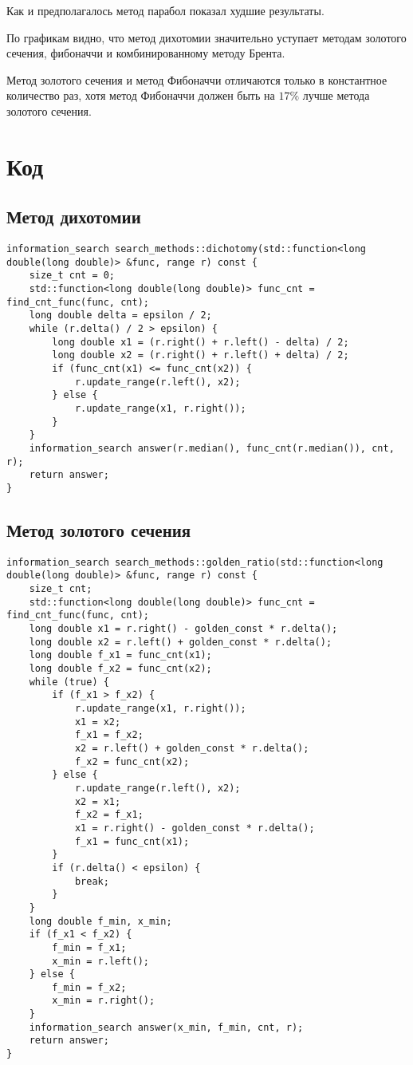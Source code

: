 Как и предполагалось метод парабол показал худшие результаты.

По графикам видно, что метод дихотомии значительно уступает
методам золотого сечения, фибоначчи и комбинированному методу Брента.

Метод золотого сечения и метод Фибоначчи отличаются только в константное количество раз, хотя 
метод Фибоначчи должен быть на $17\%$ лучше метода золотого сечения.

\newpage
\section {Код}
\subsection {Метод дихотомии}

\begin{lstlisting}
information_search search_methods::dichotomy(std::function<long double(long double)> &func, range r) const {
	size_t cnt = 0;
	std::function<long double(long double)> func_cnt = find_cnt_func(func, cnt);
	long double delta = epsilon / 2;
	while (r.delta() / 2 > epsilon) {
		long double x1 = (r.right() + r.left() - delta) / 2;
		long double x2 = (r.right() + r.left() + delta) / 2;
		if (func_cnt(x1) <= func_cnt(x2)) {
			r.update_range(r.left(), x2);
		} else {
			r.update_range(x1, r.right());
		}
	}
	information_search answer(r.median(), func_cnt(r.median()), cnt, r);
	return answer;
}
\end{lstlisting}

\newpage
\subsection {Метод золотого сечения}

\begin{lstlisting}
information_search search_methods::golden_ratio(std::function<long double(long double)> &func, range r) const {
    size_t cnt;
    std::function<long double(long double)> func_cnt = find_cnt_func(func, cnt);
    long double x1 = r.right() - golden_const * r.delta();
    long double x2 = r.left() + golden_const * r.delta();
    long double f_x1 = func_cnt(x1);
    long double f_x2 = func_cnt(x2);
    while (true) {
        if (f_x1 > f_x2) {
            r.update_range(x1, r.right());
            x1 = x2;
            f_x1 = f_x2;
            x2 = r.left() + golden_const * r.delta();
            f_x2 = func_cnt(x2);
        } else {
            r.update_range(r.left(), x2);
            x2 = x1;
            f_x2 = f_x1;
            x1 = r.right() - golden_const * r.delta();
            f_x1 = func_cnt(x1);
        }
        if (r.delta() < epsilon) {
            break;
        }
    }
    long double f_min, x_min;
    if (f_x1 < f_x2) {
        f_min = f_x1;
        x_min = r.left();
    } else {
        f_min = f_x2;
        x_min = r.right();
    }
    information_search answer(x_min, f_min, cnt, r);
    return answer;
}
\end{lstlisting}


